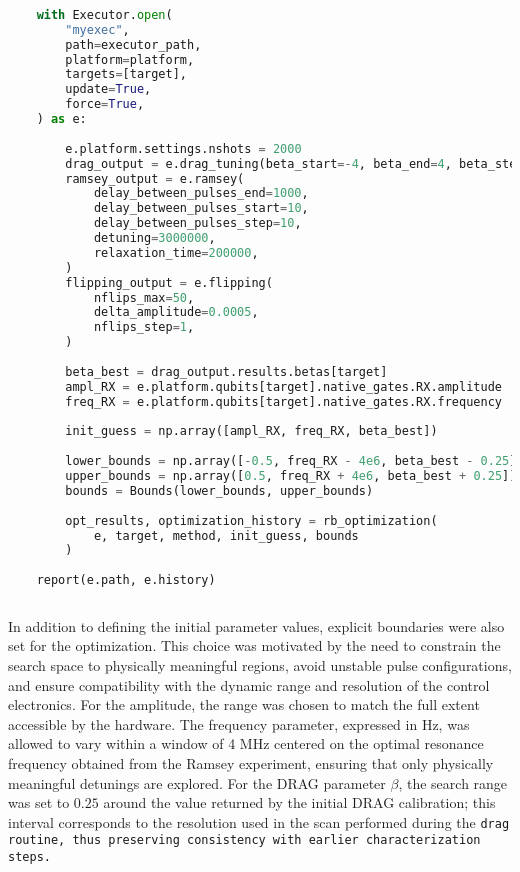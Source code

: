 \begin{lstlisting}[language=Python, caption={Code to set up the RX gate optimization experiment.}, label={snippet:params_init}]
    
    with Executor.open(
        "myexec",
        path=executor_path,
        platform=platform,
        targets=[target],
        update=True,
        force=True,
    ) as e:
    
        e.platform.settings.nshots = 2000
        drag_output = e.drag_tuning(beta_start=-4, beta_end=4, beta_step=0.5)
        ramsey_output = e.ramsey(
            delay_between_pulses_end=1000,
            delay_between_pulses_start=10,
            delay_between_pulses_step=10,
            detuning=3000000,
            relaxation_time=200000,
        )
        flipping_output = e.flipping(
            nflips_max=50,
            delta_amplitude=0.0005,  
            nflips_step=1,
        )
    
        beta_best = drag_output.results.betas[target]
        ampl_RX = e.platform.qubits[target].native_gates.RX.amplitude
        freq_RX = e.platform.qubits[target].native_gates.RX.frequency
    
        init_guess = np.array([ampl_RX, freq_RX, beta_best])
    
        lower_bounds = np.array([-0.5, freq_RX - 4e6, beta_best - 0.25])
        upper_bounds = np.array([0.5, freq_RX + 4e6, beta_best + 0.25])
        bounds = Bounds(lower_bounds, upper_bounds)
    
        opt_results, optimization_history = rb_optimization(
            e, target, method, init_guess, bounds
        )
    
    report(e.path, e.history)
    
\end{lstlisting}

In addition to defining the initial parameter values, explicit boundaries were also set for the optimization. 
This choice was motivated by the need to constrain the search space to physically meaningful regions, avoid unstable pulse configurations, and ensure compatibility with the dynamic range and resolution of the control electronics.
For the amplitude, the range was chosen to match the full extent accessible by the hardware. 
The frequency parameter, expressed in Hz, was allowed to vary within a window of 4 MHz centered on the optimal resonance frequency obtained from the Ramsey experiment, ensuring that only physically meaningful detunings are explored. 
For the DRAG parameter $\beta$, the search range was set to $0.25$ around the value returned by the initial DRAG calibration; this interval corresponds to the resolution used in the scan performed during the \tt{drag} routine, thus preserving consistency with earlier characterization steps.


